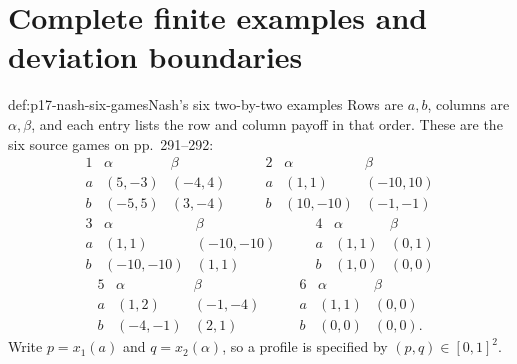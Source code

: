 \section{Complete finite examples and deviation boundaries}

\begin{hbdefinition}{def:p17-nash-six-games}{Nash's six two-by-two examples}
Rows are \(a,b\), columns are \(\alpha,\beta\), and each entry lists
the row and column payoff in that order. These are the six source
games on pp.~291--292:
\[
\begin{array}{c|cc}
1&\alpha&\beta\\ \hline
a&(5,-3)&(-4,4)\\ b&(-5,5)&(3,-4)
\end{array}
\qquad
\begin{array}{c|cc}
2&\alpha&\beta\\ \hline
a&(1,1)&(-10,10)\\ b&(10,-10)&(-1,-1)
\end{array}
\]
\[
\begin{array}{c|cc}
3&\alpha&\beta\\ \hline
a&(1,1)&(-10,-10)\\ b&(-10,-10)&(1,1)
\end{array}
\qquad
\begin{array}{c|cc}
4&\alpha&\beta\\ \hline
a&(1,1)&(0,1)\\ b&(1,0)&(0,0)
\end{array}
\]
\[
\begin{array}{c|cc}
5&\alpha&\beta\\ \hline
a&(1,2)&(-1,-4)\\ b&(-4,-1)&(2,1)
\end{array}
\qquad
\begin{array}{c|cc}
6&\alpha&\beta\\ \hline
a&(1,1)&(0,0)\\ b&(0,0)&(0,0).
\end{array}
\]
Write \(p=x_1(a)\) and \(q=x_2(\alpha)\), so a profile is
specified by \((p,q)\in[0,1]^2\).
\end{hbdefinition}

